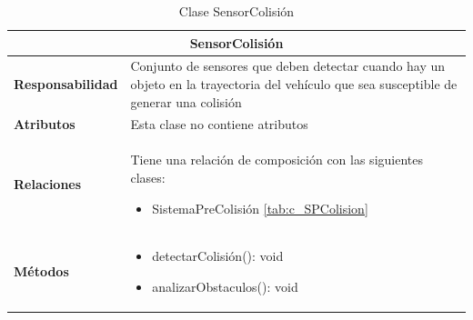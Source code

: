 \begin{table}[H]
\begin{center}
\begin{tabular}{p{} p{11cm}}
\multicolumn{2}{c}{\textbf{SensorColisión} } \\ \hline \hline
\textbf{Responsabilidad} &  Conjunto de sensores que deben detectar cuando hay un objeto en la trayectoria del vehículo que sea susceptible de generar una colisión  \\ \hline
\textbf{Atributos} & Esta clase no contiene atributos\\ \hline
\textbf{Relaciones} & \par Tiene una relación de composición con las siguientes clases:
                      \begin{itemize}
                        \item SistemaPreColisión \ref{tab:c_SPColision}
                      \end{itemize}

                      \\ \hline

\textbf{Métodos} &  \begin{itemize}
                      \item detectarColisión(): void
                      \item analizarObstaculos(): void
                    \end{itemize}\\ \hline
\end{tabular}
\caption{Clase SensorColisión}
\label{tab:c_SensorC}
\end{center}
\end{table}








